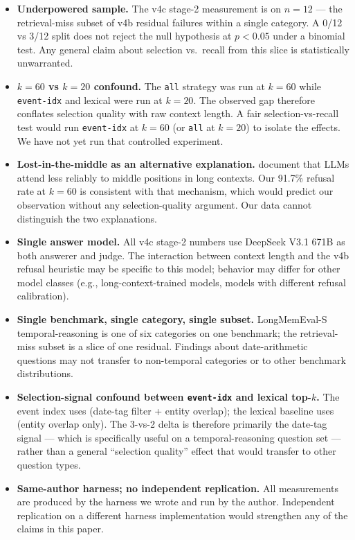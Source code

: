 \documentclass{article}
\begin{document}
\begin{itemize}
  \item \textbf{Underpowered sample.} The v4c stage-2 measurement is on $n=12$ --- the retrieval-miss subset of v4b residual failures within a single category. A 0/12 vs 3/12 split does not reject the null hypothesis at $p<0.05$ under a binomial test. Any general claim about selection vs.\ recall from this slice is statistically unwarranted.
  \item \textbf{$k=60$ vs $k=20$ confound.} The \texttt{all} strategy was run at $k=60$ while \texttt{event-idx} and lexical were run at $k=20$. The observed gap therefore conflates selection quality with raw context length. A fair selection-vs-recall test would run \texttt{event-idx} at $k=60$ (or \texttt{all} at $k=20$) to isolate the effects. We have not yet run that controlled experiment.
  \item \textbf{Lost-in-the-middle as an alternative explanation.} \citet{liu2024lost} document that LLMs attend less reliably to middle positions in long contexts. Our 91.7\% refusal rate at $k=60$ is consistent with that mechanism, which would predict our observation without any selection-quality argument. Our data cannot distinguish the two explanations.
  \item \textbf{Single answer model.} All v4c stage-2 numbers use DeepSeek V3.1 671B as both answerer and judge. The interaction between context length and the v4b refusal heuristic may be specific to this model; behavior may differ for other model classes (e.g., long-context-trained models, models with different refusal calibration).
  \item \textbf{Single benchmark, single category, single subset.} LongMemEval-S temporal-reasoning is one of six categories on one benchmark; the retrieval-miss subset is a slice of one residual. Findings about date-arithmetic questions may not transfer to non-temporal categories or to other benchmark distributions.
  \item \textbf{Selection-signal confound between \texttt{event-idx} and lexical top-$k$.} The event index uses (date-tag filter + entity overlap); the lexical baseline uses (entity overlap only). The 3-vs-2 delta is therefore primarily the date-tag signal --- which is specifically useful on a temporal-reasoning question set --- rather than a general ``selection quality'' effect that would transfer to other question types.
  \item \textbf{Same-author harness; no independent replication.} All measurements are produced by the harness we wrote and run by the author. Independent replication on a different harness implementation would strengthen any of the claims in this paper.
\end{itemize}
\end{document}
